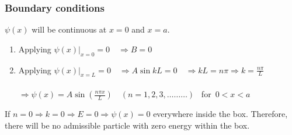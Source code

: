   \subsubsection{Boundary conditions}
  $\psi(x)$ will be continuous at $x=0$ and $x=a$.
  \begin{enumerate}
  	\item Applying $\left.\psi(x)\right|_{x=0}=0 \quad \Rightarrow B=0$
  	\item Applying $\left.\psi(x)\right|_{x=L}=0 \quad \Rightarrow A \sin k L=0 \quad \Rightarrow k L=n \pi \Rightarrow k=\frac{n \pi}{L}$\\\\
  	$\Rightarrow \psi(x)=A \sin \left(\frac{n \pi {x}}{L}\right)\quad (n=1,2,3, \ldots \ldots \ldots)$ \ for\ $0<x<a$
  \end{enumerate}
  If $n=0 \Rightarrow k=0 \Rightarrow E=0 \Rightarrow \psi(x)=0$ everywhere inside the box. Therefore, there will be no admissible particle with zero energy within the box.
  \begin{center}
  \end{center}
